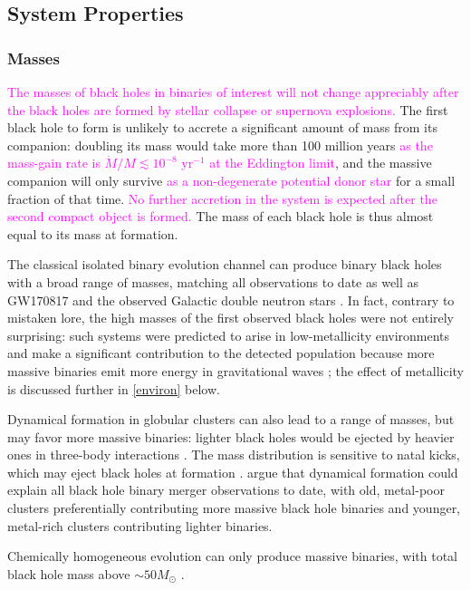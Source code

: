 \documentclass[iop,onecolumn]{revtex4}
\newcommand{\ilya}[1]{\textcolor{magenta}{#1}}
\begin{document}
\subsection{System Properties}
\subsubsection{Masses}
\ilya{The masses of black holes in binaries of interest will not change appreciably after the black holes are formed by stellar collapse or supernova explosions.}  The first black hole to form is unlikely to accrete a significant amount of mass from its companion: doubling its mass would take more than 100 million years \ilya{as the mass-gain rate is $\dot{M}/M \lesssim 10^{-8}$ yr$^{-1}$ at the Eddington limit}, and the massive companion will only survive \ilya{as a non-degenerate potential donor star} for a small fraction of that time. \ilya{No further accretion in the system is expected after the second compact object is formed.} The mass of each black hole is thus almost equal to its mass at formation. 

The classical isolated binary evolution channel can produce binary black holes with a broad range of masses, matching all observations to date \ilya{\citep[e.g.,][]{Stevenson:2017,Eldridge:2017,GiacobboMapelli:2018}} as well as GW170817 and the observed Galactic double neutron stars \citep[e.g.,][]{Kruckow:2018,VignaGomez:2018}.  In fact, contrary to mistaken lore, the high masses of the first observed black holes were not entirely surprising: such systems were predicted to arise in low-metallicity environments and make a significant contribution to the detected population because more massive binaries emit more energy in gravitational waves \citep{Dominik:2014}; the effect of metallicity is discussed further in \autoref{environ} below. 

Dynamical formation in globular clusters can also lead to a range of masses, but may favor more massive binaries: lighter black holes would be ejected by heavier ones in three-body interactions \citep{Rodriguez:2015}. The mass distribution is sensitive to natal kicks, which may eject black holes at formation \citep{Zevin:2017}.  \citet{Chatterjee:2017} argue that dynamical formation could explain all black hole binary merger observations to date, with old, metal-poor clusters preferentially contributing more massive black hole binaries and younger, metal-rich clusters contributing lighter binaries.
 
Chemically homogeneous evolution can only produce massive binaries, with total black hole mass above $\sim 50 M_\odot$ \citep{MandeldeMink:2016,Marchant:2016}.
\end{document}
